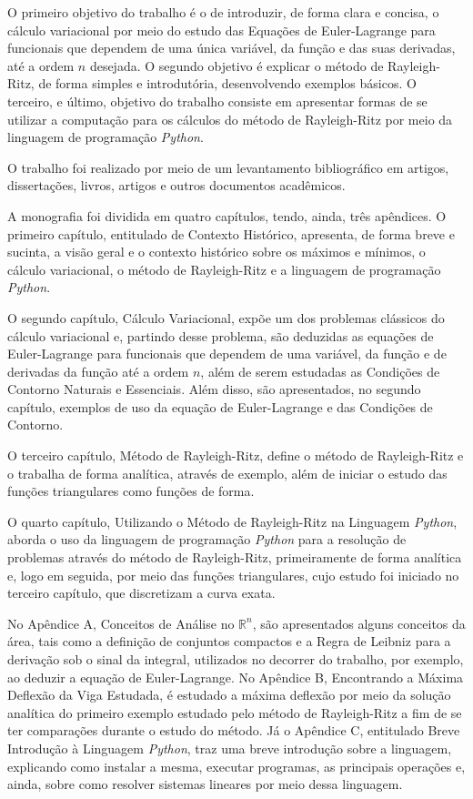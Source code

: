 \documentclass[
	12pt,				%
	openright,			%
    twoside,			%
	a4paper,			%
	chapter=TITLE,		%
	english,			%
	french,				%
	spanish,			%
	brazil				%
	]{abntex2}
\numberwithin{lema}{chapter}
\numberwithin{teorema}{chapter}
\numberwithin{definicao}{chapter}
\numberwithin{exemplo}{chapter}
\numberwithin{figure}{chapter}
\begin{document}
O primeiro objetivo do trabalho é o de introduzir, de forma clara e concisa, o cálculo variacional por meio do estudo das Equações de Euler-Lagrange para funcionais que dependem de uma única variável, da função e das suas derivadas, até a ordem $n$ desejada. O segundo objetivo é explicar o método de Rayleigh-Ritz, de forma simples e introdutória, desenvolvendo exemplos básicos. O terceiro, e último, objetivo do trabalho consiste em apresentar formas de se utilizar a computação para os cálculos do método de Rayleigh-Ritz por meio da linguagem de programação \textit{Python}.

O trabalho foi realizado por meio de um levantamento bibliográfico em artigos, dissertações, livros, artigos e outros documentos acadêmicos.

A monografia foi dividida em quatro capítulos, tendo, ainda, três apêndices. O primeiro capítulo, entitulado de Contexto Histórico, apresenta, de forma breve e sucinta, a visão geral e o contexto histórico sobre os máximos e mínimos, o cálculo variacional, o método de Rayleigh-Ritz e a linguagem de programação \textit{Python}. 

O segundo capítulo, Cálculo Variacional, expõe um dos problemas clássicos do cálculo variacional e, partindo desse problema, são deduzidas as equações de Euler-Lagrange para funcionais que dependem de uma variável, da função e de derivadas da função até a ordem $n$, além de serem estudadas as Condições de Contorno Naturais e Essenciais. Além disso, são apresentados, no segundo capítulo, exemplos de uso da equação de Euler-Lagrange e das Condições de Contorno. 

O terceiro capítulo, Método de Rayleigh-Ritz, define o método de Rayleigh-Ritz e o trabalha de forma analítica, através de exemplo, além de iniciar o estudo das funções triangulares como funções de forma. 

O quarto capítulo, Utilizando o Método de Rayleigh-Ritz na Linguagem \textit{Python}, aborda o uso da linguagem de programação \textit{Python} para a resolução de problemas através do método de Rayleigh-Ritz, primeiramente de forma analítica e, logo em seguida, por meio das funções triangulares, cujo estudo foi iniciado no terceiro capítulo, que discretizam a curva exata.

No Apêndice A, Conceitos de Análise no $\mathbb{R}^n$, são apresentados alguns conceitos da área, tais como a definição de conjuntos compactos e a Regra de Leibniz para a derivação sob o sinal da integral, utilizados no decorrer do trabalho, por exemplo, ao deduzir a equação de Euler-Lagrange. No Apêndice B, Encontrando a Máxima Deflexão da Viga Estudada, é estudado a máxima deflexão por meio da solução analítica do primeiro exemplo estudado pelo método de Rayleigh-Ritz a fim de se ter comparações durante o estudo do método. Já o Apêndice C, entitulado Breve Introdução à Linguagem \textit{Python}, traz uma breve introdução sobre a linguagem, explicando como instalar a mesma, executar programas, as principais operações e, ainda, sobre como resolver sistemas lineares por meio dessa linguagem.
\end{document}
